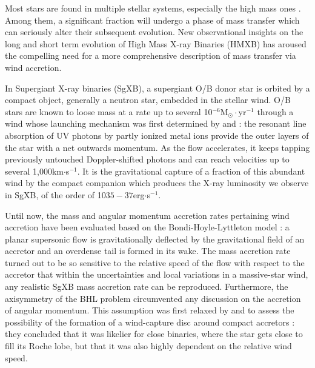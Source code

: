\documentclass{aa}
\makeatletter
\newcommand{\sgx}{SgXB\xspace}
\newcommand*{\hmxb}{HMXB\@\xspace}
\newcommand*{\rlof}{RLOF\@\xspace}
\makeatother
\begin{document}
Most stars are found in multiple stellar systems, especially the high mass ones \citep{Duchene2013}. Among them, a significant fraction will undergo a phase of mass transfer which can seriously alter their subsequent evolution. New observational insights on the long \citep{Abbott2016a} and short term \citep{Grinberg2017} evolution of High Mass X-ray Binaries (\hmxb) has aroused the compelling need for a more comprehensive description of mass transfer via wind accretion. 


In Supergiant X-ray binaries (\sgx), a supergiant O/B donor star is orbited by a compact object, generally a neutron star, embedded in the stellar wind. O/B stars are known to loose mass at a rate up to several 10$^{-6}$M$_{\odot}\cdot$yr$^{-1}$ through a wind whose launching mechanism was first determined by \cite{Lucy1970} and \cite{Castor1975} : the resonant line absorption of UV photons by partly ionized metal ions provide the outer layers of the star with a net outwards momentum. As the flow accelerates, it keeps tapping previously untouched Doppler-shifted photons and can reach velocities up to several 1,000km$\cdot$s$^{-1}$. It is the gravitational capture of a fraction of this abundant wind by the compact companion which produces the X-ray luminosity we observe in \sgx, of the order of 10${35-37}$erg$\cdot$s$^{-1}$.

Until now, the mass and angular momentum accretion rates pertaining wind accretion have been evaluated based on the Bondi-Hoyle-Lyttleton model \citep[BHL, see][for a review]{Edgar:2004ip} : a planar supersonic flow is gravitationally deflected by the gravitational field of an accretor and an overdense tail is formed in its wake. The mass accretion rate turned out to be so sensitive to the relative speed of the flow with respect to the accretor that within the uncertainties and local variations in a massive-star wind, any realistic \sgx mass accretion rate can be reproduced. Furthermore, the axisymmetry of the BHL problem circumvented any discussion on the accretion of angular momentum. This assumption was first relaxed by \cite{Illarionov1975} and \cite{Shapiro1976} to assess the possibility of the formation of a wind-capture disc around compact accretors : they concluded that it was likelier for close binaries, where the star gets close to fill its Roche lobe, but that it was also highly dependent on the relative wind speed. 
\end{document}
